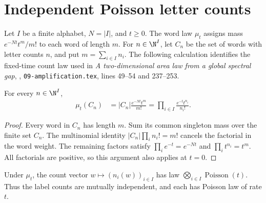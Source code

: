 \section{Independent Poisson letter counts}
\label{sec:poisson_independent_counts}

Let $I$ be a finite alphabet, $N=|I|$, and $t\ge0$.  The word law $\mu_t$
assigns mass $e^{-Nt}t^m/m!$ to each word of length $m$.  For
$n\in\N^I$, let $C_n$ be the set of words with letter counts $n$, and put
$m=\sum_{i\in I}n_i$.  The following calculation identifies the fixed-time
count law used in \emph{A two-dimensional area law from a global spectral gap},
\cite{OpenAI2026AreaLaw}, \texttt{09-amplification.tex}, lines 49--54 and
237--253.

\begin{lemma}
    \label{lem:poisson_count_event_mass}
    \leanok
    For every $n\in\N^I$,
    \begin{align}
        \mu_t(C_n)
        &= |C_n|\frac{e^{-Nt}t^m}{m!}
         = \prod_{i\in I}\frac{e^{-t}t^{n_i}}{n_i!}.
        \label{eq:poisson_count_event_mass}
    \end{align}
\end{lemma}

\begin{proof}
    \leanok
    Every word in $C_n$ has length $m$.  Sum its common singleton mass
    over the finite set $C_n$.  The multinomial identity
    $|C_n|\prod_i n_i!=m!$ cancels the factorial in the word weight.
    The remaining factors satisfy
    $\prod_i e^{-t}=e^{-Nt}$ and $\prod_i t^{n_i}=t^m$.
    All factorials are positive, so this argument also applies at $t=0$.
\end{proof}

\begin{theorem}
    \label{thm:poisson_independent_counts}
    \leanok
    Under $\mu_t$, the count vector $w\mapsto(n_i(w))_{i\in I}$ has law
    $\bigotimes_{i\in I}\operatorname{Poisson}(t)$.
    Thus the label counts are mutually independent, and each has
    Poisson law of rate $t$.
\end{theorem}

